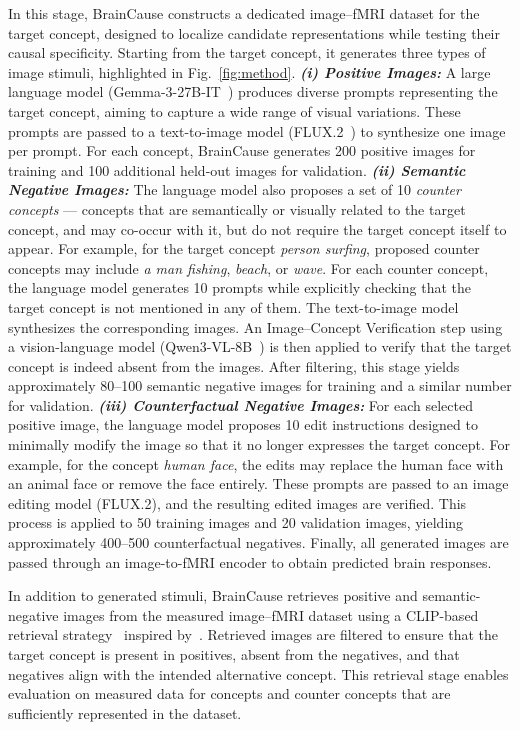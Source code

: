 \documentclass{llmxive}
\begin{document}
In this stage, BrainCause constructs a dedicated image--fMRI dataset for the target concept, designed to localize candidate representations while testing their causal specificity. Starting from the target concept, it generates three types of image stimuli, highlighted in Fig.~\ref{fig:method}. \emph{\textbf{(i) Positive Images:}} A large language model (Gemma-3-27B-IT~\cite{gemma_2025}) produces diverse prompts representing the target concept, aiming to capture a wide range of visual variations. These prompts are passed to a text-to-image model (FLUX.2~\cite{flux-2-2025}) to synthesize one image per prompt. For each concept, BrainCause generates 200 positive images for training and 100 additional held-out images for validation. \emph{\textbf{(ii) Semantic Negative Images:}} The language model also proposes a set of 10 \emph{counter concepts} --- concepts that are semantically or visually related to the target concept, and may co-occur with it, but do not require the target concept itself to appear. For example, for the target concept \emph{person surfing}, proposed counter concepts may include \emph{a man fishing}, \emph{beach}, or \emph{wave}. For each counter concept, the language model generates 10 prompts while explicitly checking that the target concept is not mentioned in any of them. The text-to-image model synthesizes the corresponding images. An Image--Concept Verification step using a vision-language model (Qwen3-VL-8B~\cite{qwen3technicalreport}) is then applied to verify that the target concept is indeed absent from the images. After filtering, this stage yields approximately 80--100 semantic negative images for training and a similar number for validation. \emph{\textbf{(iii) Counterfactual Negative Images:}} For each selected positive image, the language model proposes 10 edit instructions designed to minimally modify the image so that it no longer expresses the target concept. For example, for the concept \emph{human face}, the edits may replace the human face with an animal face or remove the face entirely. These prompts are passed to an image editing model (FLUX.2), and the resulting edited images are verified. This process is applied to 50 training images and 20 validation images, yielding approximately 400--500 counterfactual negatives. Finally, all generated images are passed through an image-to-fMRI encoder to obtain predicted brain responses.

In addition to generated stimuli, BrainCause retrieves positive and semantic-negative images from the measured image--fMRI dataset using a CLIP-based retrieval strategy~\cite{radford2021learning} inspired by~\cite{Bao2025MindSimulator}. Retrieved images are filtered to ensure that the target concept is present in positives, absent from the negatives, and that negatives align with the intended alternative concept. This retrieval stage enables evaluation on measured data for concepts and counter concepts that are sufficiently represented in the dataset. 
\end{document}
